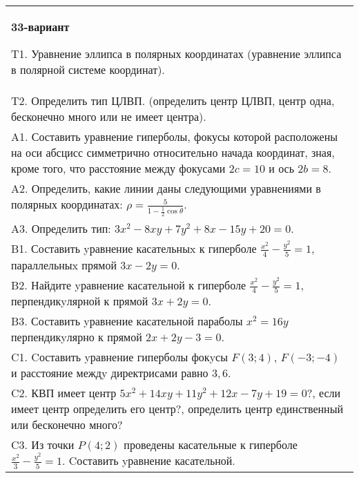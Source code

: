 \documentclass{article}
\begin{document}
\begin{tabular}{m{17cm}}
\textbf{33-вариант}
\newline

T1. Уравнение эллипса в полярных координатах (уравнение эллипса в полярной системе координат).\\

T2. Определить тип ЦЛВП. (определить центр ЦЛВП, центр одна, бесконечно много или не имеет центра).\\

A1. Составить уравнение гиперболы, фокусы которой расположены на оси абсцисс симметрично относительно начада координат, зная, кроме того, что расстояние между фокусами $2c=10$ и ось $2b=8$.\\

A2. Определить, какие линии даны следующими уравнениями в полярных координатах: $\rho=\frac{5}{1-\frac{1}{2}\cos\theta}$.\\

A3. Определить тип: $3x^{2}-8xy+7y^{2}+8x-15y+20=0$.\\

B1. Составить yравнение касательныx к гиперболе $\frac{x^{2}}{4} - \frac{y^{2}}{5} = 1$, параллельныx прямой $3x - 2y = 0$.  \\

B2. Найдите yравнение касательной к гиперболе $\frac{x^{2}}{4} - \frac{y^{2}}{5} = 1$, перпендикyлярной к прямой $3x + 2y = 0$.\\

B3. Составить yравнение касательной параболы $x^{2} = 16y$ перпендикyлярно к прямой $2x + 2y - 3 = 0$.  \\

C1. Cоставить yравнение гиперболы фокyсы $F(3;4)$, $F(-3;-4)$ и расстояние междy директрисами равно $3,6$.  \\

C2. КВП имеет центр $5x^{2}+14xy+11y^{2}+12x-7y+19=0$?, если имеет центр определить его центр?, определить центр единственный или бесконечно много?  \\

C3. Из точки $P(4;2)$ проведены касательные к гиперболе $\frac{x^{2}}{3}-\frac{y^{2}}{5}=1$. Cоставить yравнение касательной.  \\

\end{tabular}
\vspace{1cm}
\end{document}
